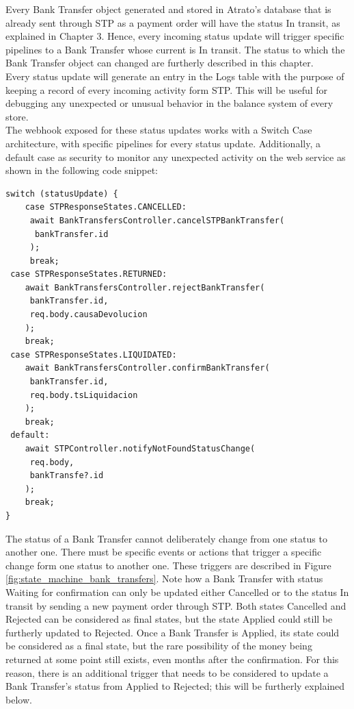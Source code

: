 Every Bank Transfer object generated and stored in Atrato’s database that is already sent through STP as a payment order will have the status In transit, as explained in Chapter 3. Hence, every incoming status update will trigger specific pipelines to a Bank Transfer whose current is In transit. The status to which the Bank Transfer object can changed are furtherly described in this chapter.\\

Every status update will generate an entry in the Logs table with the purpose of keeping a record of every incoming activity form STP. This will be useful for debugging any unexpected or unusual behavior in the balance system of every store.\\

The webhook exposed for these status updates works with a Switch Case architecture, with specific pipelines for every status update. Additionally, a default case as security to monitor any unexpected activity on the web service as shown in the following code snippet:\\

\begin{verbatim}
switch (statusUpdate) {
    case STPResponseStates.CANCELLED:
     await BankTransfersController.cancelSTPBankTransfer(
      bankTransfer.id
     );
     break;
 case STPResponseStates.RETURNED:
    await BankTransfersController.rejectBankTransfer(
     bankTransfer.id,
     req.body.causaDevolucion
    );
    break;
 case STPResponseStates.LIQUIDATED:
    await BankTransfersController.confirmBankTransfer(
     bankTransfer.id,
     req.body.tsLiquidacion
    );
    break;
 default:
    await STPController.notifyNotFoundStatusChange(
     req.body,
     bankTransfe?.id
    );
    break;
}

\end{verbatim}

The status of a Bank Transfer cannot deliberately change from one status to another one. There must be specific events or actions that trigger a specific change form one status to another one. These triggers are described in Figure \ref{fig:state_machine_bank_transfers}. Note how a Bank Transfer with status Waiting for confirmation can only be updated either Cancelled or to the status In transit by sending a new payment order through STP. Both states Cancelled and Rejected can be considered as final states, but the state Applied could still be furtherly updated to Rejected. Once a Bank Transfer is Applied, its state could be considered as a final state, but the rare possibility of the money being returned at some point still exists, even months after the confirmation. For this reason, there is an additional trigger that needs to be considered to update a Bank Transfer’s status from Applied to Rejected; this will be furtherly explained below.

